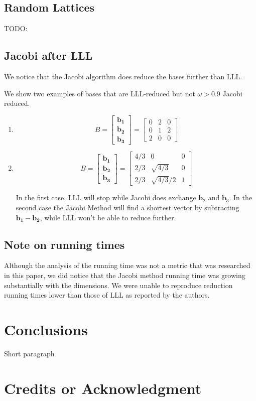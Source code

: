 \documentclass[10pt, a4paper]{article}
\newcommand{\my}[1]{{\color{blue} #1 }}
\renewcommand{\vec}[1]{\mathbf{#1}}
\begin{document}
\subsection{Random Lattices}

TODO: 

\subsection{Jacobi after LLL}

We notice that the Jacobi algorithm does reduce the bases further than LLL.

We show two examples of bases that are LLL-reduced but not $\omega > 0.9$ Jacobi reduced.

\begin{enumerate}

\item \[
B = \begin{bmatrix}
  \vec{b_1} \\
  \vec{b_2} \\
  \vec{b_3}
 \end{bmatrix} = \begin{bmatrix}
  0 & 2 & 0 \\
  0 & 1 & 2 \\
  2 & 0 & 0
 \end{bmatrix}
\]


\item \[
B = \begin{bmatrix}
  \vec{b_1} \\
  \vec{b_2} \\
  \vec{b_3}
 \end{bmatrix} = \begin{bmatrix}
  4/3 & 0 & 0 \\
  2/3 & \sqrt{4/3} & 0 \\
  2/3 & \sqrt{4/3}/2 & 1
 \end{bmatrix}
\]

In the first case, LLL will stop while Jacobi does exchange $\vec{b}_2$ and $\vec{b}_3$. In the second case the Jacobi Method will find a shortest vector by subtracting $\vec{b_1}-\vec{b_2}$, while LLL won't be able to reduce further.
\end{enumerate}

\subsection{Note on running times}
Although the analysis of the running time was not a metric that was researched in this paper, we did notice that the Jacobi method running time was growing substantially with the dimensions. We were unable to reproduce reduction running times lower than those of LLL as reported by the authors.



\section{Conclusions}
\my{Short paragraph}
\section{Credits \my{ or Acknowledgment}}



\end{document}
